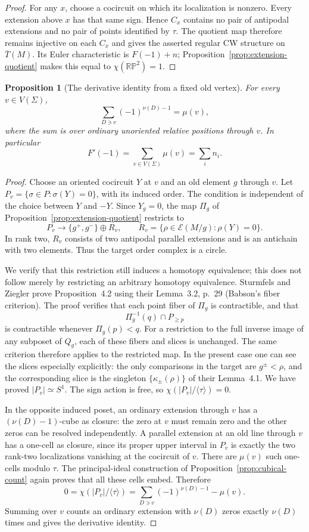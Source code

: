 \documentclass[11pt]{article}
\newtheorem{proposition}[theorem]{Proposition}
\theoremstyle{definition}\newtheorem{definition}[theorem]{Definition}
\begin{document}
\begin{proof}
For any $x$, choose a cocircuit on which its localization is nonzero. Every
extension above $x$ has that same sign. Hence $C_x$ contains no pair of
antipodal extensions and no pair of points identified by $\tau$. The quotient
map therefore remains injective on each $C_x$ and gives the asserted regular
CW structure on $\overline T(M)$. Its Euler characteristic is
$F(-1)+n$; Proposition~\ref{prop:extension-quotient} makes this equal to $\chi(\mathbb {RP}^2)=1$.
\end{proof}

\begin{proposition}[The derivative identity from a fixed old vertex]\label{prop:derivative-count}
For every $v\in V(\Sigma)$,
\[
 \sum_{D\ni v}(-1)^{\nu(D)-1}=\mu(v),
\]
where the sum is over ordinary unoriented relative positions through $v$.
In particular
\[
 \boxed{F'(-1)=\sum_{v\in V(\Sigma)}\mu(v)=\sum_i n_i.}
\]
\end{proposition}
\begin{proof}
Choose an oriented cocircuit $Y$ at $v$ and an old element $g$ through $v$.
Let $P_v=\{\sigma\in P:\sigma(Y)=0\}$, with its induced order. The condition
is independent of the choice between $Y$ and $-Y$. Since $Y_g=0$, the map
$\Pi_g$ of Proposition~\ref{prop:extension-quotient} restricts to
\[
 P_v\longrightarrow\{g^+,g^-\}\oplus R_v,
 \qquad R_v=\{\rho\in\mathcal E(M/g):\rho(Y)=0\}.
\]
In rank two, $R_v$ consists of two antipodal parallel extensions and is an
antichain with two elements. Thus the target order complex is a circle.

We verify that this restriction still induces a homotopy equivalence; this
does not follow merely by restricting an arbitrary homotopy equivalence.
Sturmfels and Ziegler prove Proposition~4.2 using their Lemma~3.2, p.~29
(Babson's fiber criterion). The proof verifies that each point fiber of
$\Pi_g$ is contractible, and that
\[
 \Pi_g^{-1}(q)\cap P_{\geq p}
\]
is contractible whenever $\Pi_g(p)<q$. For a restriction to the full inverse
image of any subposet of $Q_g$, each of these fibers and slices is unchanged.
The same criterion therefore applies to the restricted map. In the present
case one can see the slices especially explicitly: the only comparisons
in the target are $g^\pm<\rho$, and the corresponding slice is the singleton
$\{\kappa_\pm(\rho)\}$ of their Lemma~4.1. We have proved $|P_v|\simeq S^1$.
The sign action is free, so $\chi(|P_v|/\langle\tau\rangle)=0$.

In the opposite induced poset, an ordinary extension through $v$ has a
$(\nu(D)-1)$-cube as closure: the zero at $v$ must remain zero and the other
zeros can be resolved independently. A parallel extension at an old line
through $v$ has a one-cell as closure, since its proper upper interval in
$P_v$ is exactly the two rank-two localizations vanishing at the cocircuit
of $v$. There are $\mu(v)$ such one-cells modulo $\tau$. The principal-ideal
construction of Proposition~\ref{prop:cubical-count} again proves that all these cells embed. Therefore
\[
 0=\chi(|P_v|/\langle\tau\rangle)
   =\sum_{D\ni v}(-1)^{\nu(D)-1}-\mu(v).
\]
Summing over $v$ counts an ordinary extension with $\nu(D)$ zeros exactly
$\nu(D)$ times and gives the derivative identity.
\end{proof}
\end{document}
